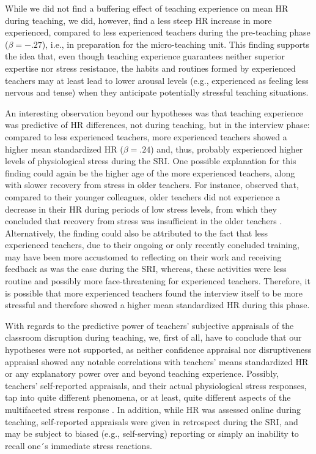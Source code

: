 \documentclass[preprint, 3p,
authoryear]{elsarticle} %
\begin{document}
While we did not find a buffering effect of teaching experience on mean
HR during teaching, we did, however, find a less steep HR increase in
more experienced, compared to less experienced teachers during the
pre-teaching phase (\(\beta = -.27\)), i.e., in preparation for the
micro-teaching unit. This finding supports the idea that, even though
teaching experience guarantees neither superior expertise nor stress
resistance, the habits and routines formed by experienced teachers may
at least lead to lower arousal levels (e.g., experienced as feeling less
nervous and tense) when they anticipate potentially stressful teaching
situations.

An interesting observation beyond our hypotheses was that teaching
experience was predictive of HR differences, not during teaching, but in
the interview phase: compared to less experienced teachers, more
experienced teachers showed a higher mean standardized HR
(\(\beta = .24\)) and, thus, probably experienced higher levels of
physiological stress during the SRI. One possible explanation for this
finding could again be the higher age of the more experienced teachers,
along with slower recovery from stress in older teachers. For instance,
\citet{ritvanen2006responses} observed that, compared to their younger
colleagues, older teachers did not experience a decrease in their HR
during periods of low stress levels, from which they concluded that
recovery from stress was insufficient in the older teachers
\citep{ritvanen2006responses}. Alternatively, the finding could also be
attributed to the fact that less experienced teachers, due to their
ongoing or only recently concluded training, may have been more
accustomed to reflecting on their work and receiving feedback as was the
case during the SRI, whereas, these activities were less routine and
possibly more face-threatening for experienced teachers. Therefore, it
is possible that more experienced teachers found the interview itself to
be more stressful and therefore showed a higher mean standardized HR
during this phase.

With regards to the predictive power of teachers' subjective appraisals
of the classroom disruption during teaching, we, first of all, have to
conclude that our hypotheses were not supported, as neither confidence
appraisal nor disruptiveness appraisal showed any notable correlations
with teachers' means standardized HR or any explanatory power over and
beyond teaching experience. Possibly, teachers' self-reported
appraisals, and their actual physiological stress responses, tap into
quite different phenomena, or at least, quite different aspects of the
multifaceted stress response \citep{kyriacou1978}. In addition, while HR
was assessed online during teaching, self-reported appraisals were given
in retrospect during the SRI, and may be subject to biased (e.g.,
self-serving) reporting or simply an inability to recall one´s immediate
stress reactions.
\end{document}
